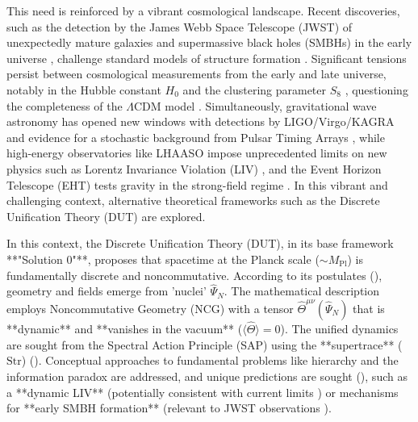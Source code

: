 \documentclass[11pt, a4paper]{article}
\theoremstyle{remark}
\newcommand{\Op}[1]{\hat{#1}}
\newcommand{\Str}{\mathrm{Str}}
\newcommand{\Mpl}{M_{\mathrm{Pl}}}
\begin{document}
This need is reinforced by a vibrant cosmological landscape. Recent discoveries, such as the detection by the James Webb Space Telescope (JWST) of unexpectedly mature galaxies and supermassive black holes (SMBHs) in the early universe \citep[e.g.,][]{Labbe:2023}, challenge standard models of structure formation \citep{Banados:2017unc, Volonteri:2010wz}. Significant tensions persist between cosmological measurements from the early and late universe, notably in the Hubble constant \(H_0\) and the clustering parameter \(S_8\) \citep[e.g.,][]{Abdalla:2022}, questioning the completeness of the $\Lambda$CDM model \citep[e.g.,][]{Planck:2018vyg}. Simultaneously, gravitational wave astronomy has opened new windows with detections by LIGO/Virgo/KAGRA \citep[e.g.,][]{LVK:GWTC3} and evidence for a stochastic background from Pulsar Timing Arrays \citep[e.g.,][]{NANOGrav:2023gor}, while high-energy observatories like LHAASO impose unprecedented limits on new physics such as Lorentz Invariance Violation (LIV) \citep[e.g.,][]{LHAASO_GRB221009A_LIV}, and the Event Horizon Telescope (EHT) tests gravity in the strong-field regime \citep[e.g.,][]{EHT:SgrA_PaperI}. In this vibrant and challenging context, alternative theoretical frameworks such as the Discrete Unification Theory (DUT) are explored.

In this context, the Discrete Unification Theory (DUT), in its base framework **"Solution 0"**, proposes that spacetime at the Planck scale (\(\sim \Mpl\)) is fundamentally discrete and noncommutative. According to its postulates (), geometry and fields emerge from 'nuclei' \( \Op{\Psi}_N \). The mathematical description employs Noncommutative Geometry (NCG) \citep{Connes1994, Madore1995, GraciaBondia2001NCG} with a tensor \( \Op{\Theta}^{\mu\nu}(\Op{\Psi}_N) \) that is **dynamic** and **vanishes in the vacuum** (\( \langle \Op{\Theta} \rangle = 0 \)). The unified dynamics are sought from the Spectral Action Principle (SAP) \citep{ConnesChamseddine1997} using the **supertrace** (\(\Str\)) (). Conceptual approaches to fundamental problems like hierarchy and the information paradox are addressed, and unique predictions are sought (), such as a **dynamic LIV** (potentially consistent with current limits \citep[e.g.,][]{LHAASO_GRB221009A_LIV}) or mechanisms for **early SMBH formation** (relevant to JWST observations \citep[e.g.,][]{Labbe:2023}).
\end{document}
